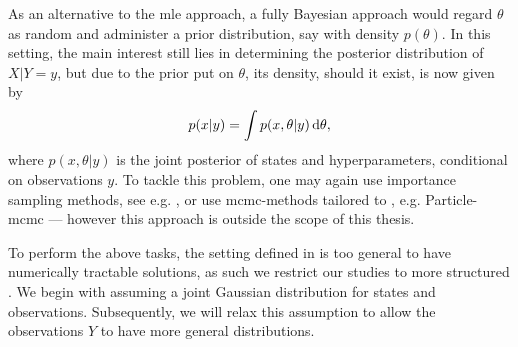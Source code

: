 As an alternative to the \acrshort{mle} approach, a fully Bayesian approach would regard $\theta$ as random and administer a prior distribution, say with density $p(\theta)$. In this setting, the main interest still lies in determining the posterior distribution of $X|Y=y$, but due to the prior put on $\theta$, its density, should it exist, is now given by
$$
p(x|y) = \int p(x,\theta|y) \,\mathrm d \theta,
$$
where $p(x,\theta|y)$ is the joint posterior of states and hyperparameters, conditional on observations $y$. To tackle this problem, one may again use importance sampling methods, see e.g. \citep[Chapter 13.1]{Durbin2012Time}, or use \acrshort{mcmc}-methods tailored to , e.g. Particle-\acrshort{mcmc} \citep[Chapter 16]{Chopin2020Introduction} --- however this approach is outside the scope of this thesis.

To perform the above tasks, the setting defined in  is too general to have numerically tractable solutions, as such we restrict our studies to more structured . We begin with assuming a joint Gaussian distribution for states and observations. Subsequently, we will relax this assumption to allow the observations $Y$ to have more general distributions. 
%





%



